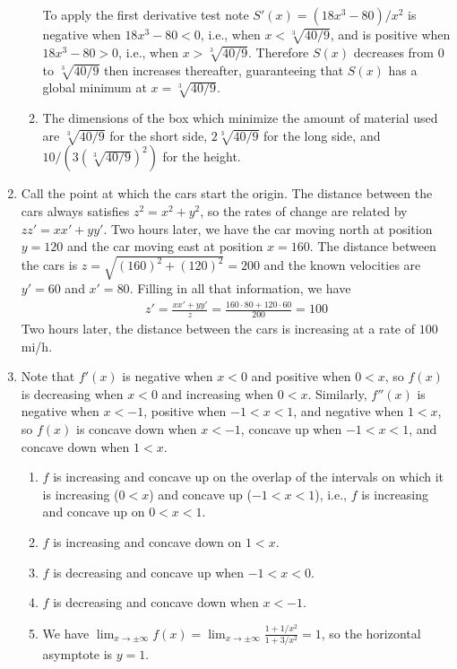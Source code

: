 \documentclass{article}
\newcommand{\ds}{\displaystyle}
\begin{document}
\begin{enumerate}
\begin{enumerate}
    To apply the first derivative test note $S'(x)=(18x^3-80)/x^2$ is
    negative when $18x^3-80<0$, i.e., when $x<\sqrt[3]{40/9}$, and is
    positive when $18x^3-80>0$, i.e., when $x>\sqrt[3]{40/9}$.  Therefore
    $S(x)$ decreases from $0$ to $\sqrt[3]{40/9}$ then increases thereafter,
    guaranteeing that $S(x)$ has a global minimum at $x=\sqrt[3]{40/9}$.
  \item The dimensions of the box which minimize the amount of material
    used are $\sqrt[3]{40/9}$ for the short side, $2\sqrt[3]{40/9}$ for the
    long side, and $10/(3(\sqrt[3]{40/9})^2)$ for the height.
  \end{enumerate}
\item Call the point at which the cars start the origin.  
  The distance between the cars always satisfies $z^2=x^2+y^2$, so the
  rates of change are related by $zz'=xx'+yy'$.
  Two hours later,
  we have the car moving north at position $y=120$ and the car moving east
  at position $x=160$.  The distance between the cars is $z=\sqrt{(160)^2
  +(120)^2}= 200$ and the known velocities are $y'=60$ and $x'=80$.
  Filling in all that information, we have
  \begin{align*}
    z' = \frac{xx'+yy'}{z}
    = \frac{160\cdot 80 + 120\cdot 60}{200} = 100
  \end{align*}
  Two hours later, the distance between the cars is increasing at a rate
  of $100$ mi/h.
\item Note that $f'(x)$ is negative when $x<0$ and positive when $0<x$,
  so $f(x)$ is decreasing when $x<0$ and increasing when $0<x$.  Similarly,
  $f''(x)$ is negative when $x<-1$, positive when $-1<x<1$, and negative
  when $1<x$, so $f(x)$ is concave down when $x<-1$, concave up when
  $-1<x<1$, and concave down when $1<x$.
  \begin{enumerate}
  \item $f$ is increasing and concave up on the overlap of the intervals
    on which it is increasing ($0<x$) and concave up ($-1<x<1$), i.e.,
    $f$ is increasing and concave up on $0<x<1$.
  \item $f$ is increasing and concave down on $1<x$.
  \item $f$ is decreasing and concave up when $-1<x<0$.
  \item $f$ is decreasing and concave down when $x<-1$.
  \item We have $\ds \lim_{x\to\pm\infty} f(x) = 
    \lim_{x\to\pm\infty} \frac{1+1/x^2}{1+3/x^2} = 1$, so the
    horizontal asymptote is $y=1$.
  \end{enumerate}

\end{enumerate}
\end{document}

